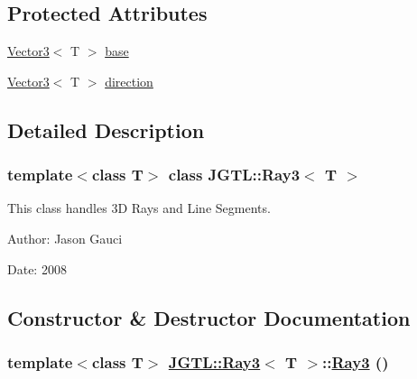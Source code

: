 \subsection*{Protected Attributes}
\begin{CompactItemize}
\item 
\hyperlink{class_j_g_t_l_1_1_vector3}{Vector3}$<$ T $>$ \hyperlink{class_j_g_t_l_1_1_ray3_7f6edc8423bebe5ad9147f216766c4cf}{base}
\item 
\hyperlink{class_j_g_t_l_1_1_vector3}{Vector3}$<$ T $>$ \hyperlink{class_j_g_t_l_1_1_ray3_611f05fc7fab5c587ae5d13aeed02b03}{direction}
\end{CompactItemize}


\subsection{Detailed Description}
\subsubsection*{template$<$class T$>$ class JGTL::Ray3$<$ T $>$}

This class handles 3D Rays and Line Segments. 

\begin{Desc}
\item[Author:]Jason Gauci \end{Desc}
\begin{Desc}
\item[Date:]2008 \end{Desc}




\subsection{Constructor \& Destructor Documentation}
\hypertarget{class_j_g_t_l_1_1_ray3_4bb85483d586f50f9b322bf93e861da5}{
\subsubsection[Ray3]{\setlength{\rightskip}{0pt plus 5cm}template$<$class T$>$ \hyperlink{class_j_g_t_l_1_1_ray3}{JGTL::Ray3}$<$ T $>$::\hyperlink{class_j_g_t_l_1_1_ray3}{Ray3} ()}}
\label{class_j_g_t_l_1_1_ray3_4bb85483d586f50f9b322bf93e861da5}


